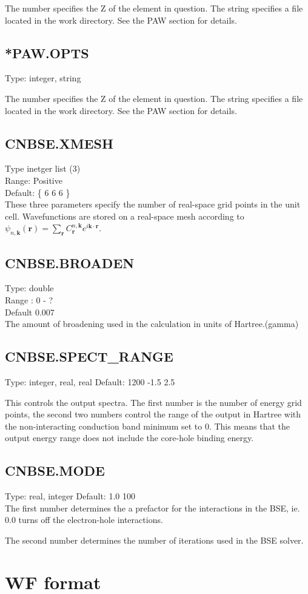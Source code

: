\documentclass[12pt]{article}
\begin{document}
The number specifies the Z of the element in question. The string specifies a file located in the 
work directory. See the PAW section for details.

\subsection{*PAW.OPTS}
Type: integer, string

The number specifies the Z of the element in question. The string specifies a file located in the      
work directory. See the PAW section for details.


\subsection{CNBSE.XMESH}
Type inetger list (3) \\
Range: Positive \\
Default: \{ 6 6 6 \} \\

These three parameters specify the number of real-space grid points 
in the unit cell. Wavefunctions are stored on a real-space mesh according to 
$\psi_{n,\mathbf{k}}(\mathbf{r}) = \sum_{\mathbf{r}}C^{n,\mathbf{k}}_{\mathbf{r}} e^{i \mathbf{k} \cdot \mathbf{r}}$. 

\subsection{CNBSE.BROADEN}
Type: double \\
Range : 0 - ? \\
Default 0.007 \\

The amount of broadening used in the calculation in units of Hartree.(gamma)

\subsection{CNBSE.SPECT\_RANGE}
Type: integer, real, real
Default: 1200 -1.5 2.5

This controls the output spectra. The first number is the number of energy grid points, the second two
numbers control the range of the output in Hartree with the non-interacting conduction band minimum
set to 0. This means that the output energy range does not include the core-hole binding energy.


\subsection{CNBSE.MODE}
Type: real, integer
Default: 1.0 100 \\

The first number determines the a prefactor for the interactions in the BSE, ie. 0.0 turns off the 
electron-hole interactions. 

The second number determines the number of iterations used in the BSE solver.

\appendix
\section{WF format}\label{WF_format}
\end{document}
